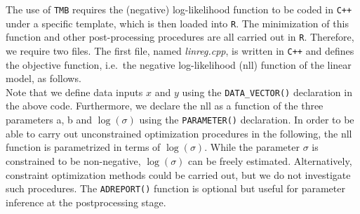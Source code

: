 \documentclass[bimj,fleqn]{w-art}\usepackage[]{graphicx}\usepackage[]{color}
\theoremstyle{plain}
\theoremstyle{definition}
\begin{document}
The use of {\tt{TMB}} requires the (negative) log-likelihood function to be coded in {\tt{C++}} under a specific template, which is then loaded into {\tt{R}}.
The minimization of this function and other post-processing procedures are all carried out in {\tt{R}}.
Therefore, we require two files.
The first file, named \textit{linreg.cpp}, is written in {\tt{C++}} and defines the objective function, i.e.~the negative log-likelihood (nll) function of the linear model, as follows.\\



Note that we define data inputs $x$ and $y$ using the \texttt{DATA\_VECTOR()} declaration in the above code.
Furthermore, we declare the nll as a function of the three parameters a, b and $\log(\sigma)$ using the \texttt{PARAMETER()} declaration.
In order to be able to carry out unconstrained optimization procedures in the following, the nll function is parametrized in terms of $\log(\sigma)$.
While the parameter $\sigma$ is constrained to be non-negative, $\log(\sigma)$ can be freely estimated.
Alternatively, constraint optimization methods could be carried out, but we do not investigate such procedures.
The \texttt{ADREPORT()} function is optional but useful for parameter inference at the postprocessing stage.
\end{document}
